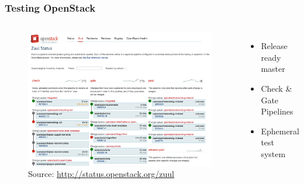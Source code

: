 \documentclass[aspectratio=169,11pt,hyperref={colorlinks=true}]{beamer}
\begin{document}
\begin{frame}
    \frametitle{Testing OpenStack}
       \begin{columns}
    \begin{figure}
    \begin{center}
    	\includegraphics[width=1\textwidth]{zuul_status.png}
         \caption{Source: \href{http://status.openstack.org/zuul}{http://status.openstack.org/zuul}}
    \end{center}
    \end{figure}
    \begin{itemize}
        \item{Release ready master}
        \item{Check \& Gate Pipelines}
        \item{Ephemeral test system}
    \end{itemize}
       \end{columns}
\end{frame}

\end{document}
